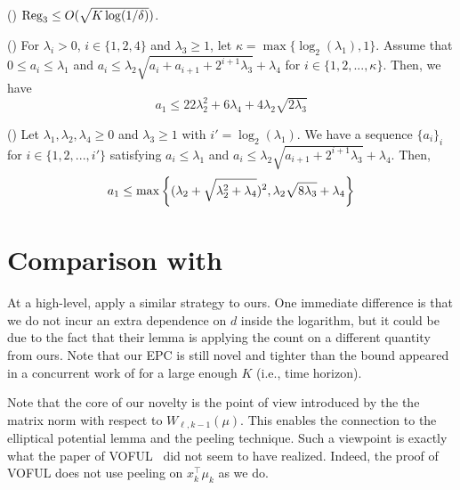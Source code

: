\begin{lemma}\label{lem-R3}(\citet[Lemma 6]{zhang21variance})
$\operatorname{{\text{Reg}}}_3\le O(\sqrt{K\log(1/{\delta})})$.
\end{lemma}

\begin{lemma}\label{rec-lem}(\citet[Lemma 12]{zhang21variance})
For $\lambda_i>0$, $i\in\{1,2,4\}$ and $\lambda_3 \ge 1$, let $\kappa=\max\{\log_2(\lambda_1),1\}$. Assume that $0\le a_i\le \lambda_1$ and $a_i \le \lambda_2 \sqrt{a_i+a_{i+1}+2^{i+1}\lambda_3}+\lambda_4$ for $i \in \{1,2,...,\kappa\}$. 
Then, we have
\begin{equation*}
    a_1 \le 22 \lambda_2^2 +6\lambda_4+4\lambda_2 \sqrt{2\lambda_3}
\end{equation*}
\end{lemma}

\begin{lemma}\label{bootstrap}(\citet[Lemma 2]{zhang2021reinforcement})
Let $\lambda_1,\lambda_2,\lambda_4 \ge0$ and $\lambda_3 \ge 1$ with $i'=\log_2(\lambda_1)$. We have a sequence $\{a_i\}_i$ for $i \in \{1,2,...,i'\}$ satisfying $a_i\le\lambda_1$ and $a_i \le \lambda_2 \sqrt{a_{i+1}+2^{i+1}\lambda_3}+\lambda_4$. Then,
\begin{equation*}
    a_1 \le \max\cbr{(\lambda_2 +\sqrt{\lambda_2^2+\lambda_4})^2,\lambda_2\sqrt{8\lambda_3}+\lambda_4}
\end{equation*}
\end{lemma}

\section{Comparison with~\citet{he2021logarithmic}}\label{app:diff}

At a high-level, \citet{he2021logarithmic} apply a similar strategy to ours. One immediate difference is that we do not incur an extra dependence on $d$ inside the logarithm, but it could be due to the fact that their lemma is applying the count on a different quantity from ours. Note that our EPC is still novel and tighter than the bound appeared in a concurrent work of \citet[Lemma 6.2]{wagenmaker2022first} for a large enough $K$ (i.e., time horizon). 

Note that the core of our novelty is the point of view introduced by the the matrix norm with respect to $W_{\ell,k-1}(\mu)$. 
This enables the connection to the elliptical potential lemma and the peeling technique. 
Such a viewpoint is exactly what the paper of VOFUL~\cite{zhang21variance} did not seem to have realized.
Indeed, the proof of VOFUL \cite{zhang21variance} does not use peeling on $x_k^\top \mu_k$ as we do.

